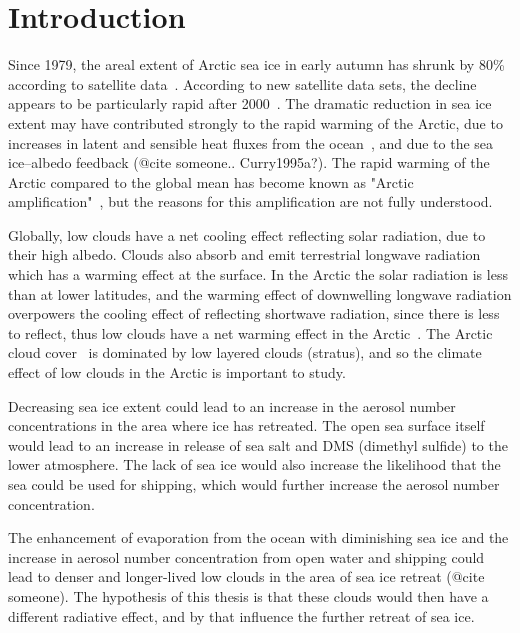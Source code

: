 \chapter{Introduction}
\label{chap:introduction}
Since 1979, the areal extent of Arctic sea ice in early autumn has shrunk by 80\% according to satellite data~\citep{NSIDC}. According to new satellite data sets, the decline appears to be particularly rapid after 2000~\citep{Wu2012}. The dramatic reduction in sea ice extent may have contributed strongly to the rapid warming of the Arctic, due to increases in latent and sensible heat fluxes from the ocean~\citep{Screen2010}, and due to the sea ice--albedo feedback (@cite someone.. Curry1995a?). The rapid warming of the Arctic compared to the global mean has become known as "Arctic amplification"~\citep{Graversen2008}, but the reasons for this amplification are not fully understood.

Globally, low clouds have a net cooling effect reflecting solar radiation, due to their high albedo. Clouds also absorb and emit terrestrial longwave radiation which has a warming effect at the surface. In the Arctic the solar radiation is less than at lower latitudes, and the warming effect of downwelling longwave radiation overpowers the cooling effect of reflecting shortwave radiation, since there is less to reflect, thus low clouds have a net warming effect in the Arctic~\citep{Shupe2004}. The Arctic cloud cover~\citep{Curry1996} is dominated by low layered clouds (stratus), and so the climate effect of low clouds in the Arctic is important to study.

Decreasing sea ice extent could lead to an increase in the aerosol number concentrations in the area where ice has retreated. The open sea surface itself would lead to an increase in release of sea salt and DMS (dimethyl sulfide) to the lower atmosphere. The lack of sea ice would also increase the likelihood that the sea could be used for shipping, which would further increase the aerosol number concentration.

The enhancement of evaporation from the ocean with diminishing sea ice and the increase in aerosol number concentration from open water and shipping could lead to denser and longer-lived low clouds in the area of sea ice retreat (@cite someone). The  hypothesis of this thesis is that these clouds would then have a different radiative effect, and by that influence the further retreat of sea ice.



